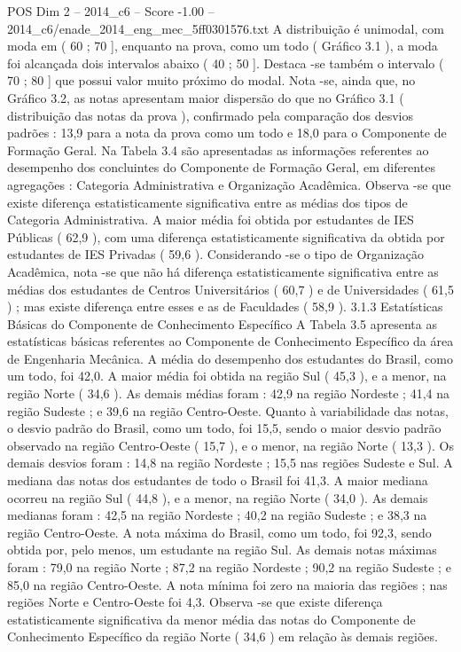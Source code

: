 \begin{textsample}{POS Dim 2 – 2014\_c6 – Score -1.00 – 2014\_c6/enade\_2014\_eng\_mec\_5ff0301576.txt}
A distribuição é unimodal, com moda em ( 60 ; 70 ], enquanto na prova, como um todo ( Gráfico 3.1 ), a moda foi alcançada dois intervalos abaixo ( 40 ; 50 ].
Destaca -se também o intervalo ( 70 ; 80 ] que possui valor muito próximo do modal.
Nota -se, ainda que, no Gráfico 3.2, as notas apresentam maior dispersão do que no Gráfico 3.1 ( distribuição das notas da prova ), confirmado pela comparação dos desvios padrões : 13,9 para a nota da prova como um todo e 18,0 para o Componente de Formação Geral.
Na Tabela 3.4 são apresentadas as informações referentes ao desempenho dos concluintes do Componente de Formação Geral, em diferentes agregações : Categoria Administrativa e Organização Acadêmica.
Observa -se que existe diferença estatisticamente significativa entre as médias dos tipos de Categoria Administrativa.
A maior média foi obtida por estudantes de IES Públicas ( 62,9 ), com uma diferença estatisticamente significativa da obtida por estudantes de IES Privadas ( 59,6 ).
Considerando -se o tipo de Organização Acadêmica, nota -se que não há diferença estatisticamente significativa entre as médias dos estudantes de Centros Universitários ( 60,7 ) e de Universidades ( 61,5 ) ; mas existe diferença entre esses e as de Faculdades ( 58,9 ). 3.1.3 Estatísticas Básicas do Componente de Conhecimento Específico A Tabela 3.5 apresenta as estatísticas básicas referentes ao Componente de Conhecimento Específico da área de Engenharia Mecânica.
A média do desempenho dos estudantes do Brasil, como um todo, foi 42,0.
A maior média foi obtida na região Sul ( 45,3 ), e a menor, na região Norte ( 34,6 ).
As demais médias foram : 42,9 na região Nordeste ; 41,4 na região Sudeste ; e 39,6 na região Centro-Oeste.
Quanto à variabilidade das notas, o desvio padrão do Brasil, como um todo, foi 15,5, sendo o maior desvio padrão observado na região Centro-Oeste ( 15,7 ), e o menor, na região Norte ( 13,3 ).
Os demais desvios foram : 14,8 na região Nordeste ; 15,5 nas regiões Sudeste e Sul.
A mediana das notas dos estudantes de todo o Brasil foi 41,3.
A maior mediana ocorreu na região Sul ( 44,8 ), e a menor, na região Norte ( 34,0 ).
As demais medianas foram : 42,5 na região Nordeste ; 40,2 na região Sudeste ; e 38,3 na região Centro-Oeste.
A nota máxima do Brasil, como um todo, foi 92,3, sendo obtida por, pelo menos, um estudante na região Sul.
As demais notas máximas foram : 79,0 na região Norte ; 87,2 na região Nordeste ; 90,2 na região Sudeste ; e 85,0 na região Centro-Oeste.
A nota mínima foi zero na maioria das regiões ; nas regiões Norte e Centro-Oeste foi 4,3.
Observa -se que existe diferença estatisticamente significativa da menor média das notas do Componente de Conhecimento Específico da região Norte ( 34,6 ) em relação às demais regiões.

\end{textsample}
